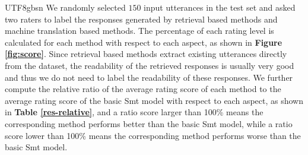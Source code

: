 \documentclass[letterpaper]{article} %
\begin{document}
\begin{CJK*}{UTF8}{gbsn}
We randomly selected $150$ input utterances in the test set and asked two raters to label the responses generated by retrieval based methods and machine translation based methods. 
The percentage of each rating level is calculated for each method with respect to each aspect, as shown in \textbf{Figure \ref{fig:score}}. %
Since retrieval based methods extract existing utterances directly from the dataset, the readability of the retrieved responses is usually very good and thus we do not need to label the readability of these responses. We further compute the relative ratio of the average rating score of each method to the average rating score of the basic {\sc Smt} model with respect to each aspect, as shown in \textbf{Table \ref{res-relative}}, and a ratio score larger than 100\% means the corresponding method performs better than the basic {\sc Smt} model, while a ratio score lower than 100\% means the corresponding method performs worse than the basic {\sc Smt} model.  


\begin{figure*}
	\centering
	\caption{Percentages of human evaluation scores}
	\label{fig:score}%
\end{figure*}


\end{CJK*}
\end{document}
